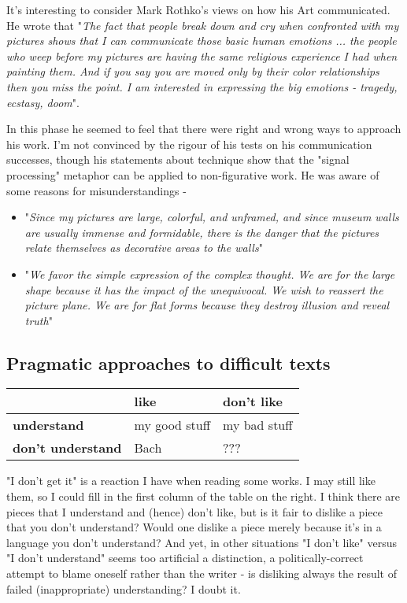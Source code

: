 \documentclass[11pt]{article}
\begin{document}
It's interesting to consider Mark Rothko's views on how his Art communicated. He wrote that "\textit{The fact that people break down and cry when confronted with          
my pictures shows that I can communicate those basic human emotions ... the                           
people who weep before my pictures are having the same religious experience                           
I had when painting them. And if you say you are moved only by their color                            
relationships then you miss the point. I am interested in expressing the big emotions - tragedy, ecstasy, doom}".


In this phase he seemed to
feel that there were right and wrong ways to approach his work. I'm not
convinced by the rigour of his tests on his communication successes, though his statements about technique show that the "signal processing" metaphor can be applied to non-figurative work. He was aware of some reasons for misunderstandings -

\begin{itemize}
\item  "\textit{Since
my pictures are large, colorful, and unframed, and since museum walls are
usually immense and formidable, there is the danger that the pictures
relate themselves as decorative areas to the walls}" 
\item  "\textit{We favor the
simple expression of the complex thought. We are for the large shape
because it has the impact of the unequivocal. We wish to reassert the
picture plane. We are for flat forms because they destroy illusion and
reveal truth}" 
\end{itemize}

\newpage\subsection{Pragmatic approaches to difficult texts}
\begin{table}[htbp]
\centering
\begin{tabular}{|l|l|l|}\hline
 & \textbf{like} &\textbf{ don't like} \\\hline
\textbf{understand} & my good stuff& my bad stuff\\\hline
\textbf{don't understand} &Bach & ???\\\hline
\end{tabular}
\end{table}
"I don't get it" is a reaction I have when reading some works. I may still like them, so I could fill in the first column of the table on the right. I think there are pieces that I understand and (hence) don't like, but is it fair to dislike a piece that you don't understand? Would one dislike a piece merely because it's in a language you don't understand? And yet, in other situations "I don't like" versus "I don't understand" seems too artificial a distinction, a politically-correct attempt to blame oneself rather than the writer - is disliking always the result of failed (inappropriate) understanding? I doubt it. 
\end{document}

